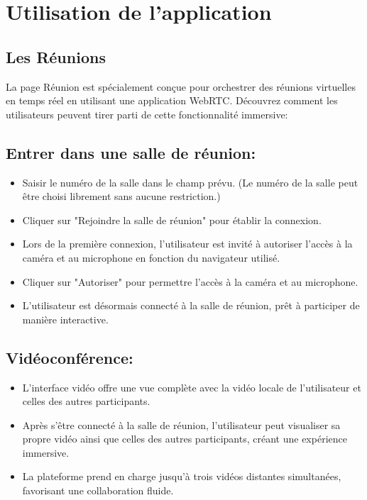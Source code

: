\documentclass[12pt, a4paper, oneside]{article}
\begin{document}
\newpage

\section{Utilisation de l'application}

\subsection{Les Réunions}

La page Réunion est spécialement conçue pour orchestrer des réunions virtuelles en temps réel en utilisant une application WebRTC. Découvrez comment les utilisateurs peuvent tirer parti de cette fonctionnalité immersive:

\subsection*{Entrer dans une salle de réunion:}
\begin{itemize}
  \item Saisir le numéro de la salle dans le champ prévu. (Le numéro de la salle peut être choisi librement sans aucune restriction.)
  \item Cliquer sur "Rejoindre la salle de réunion" pour établir la connexion.
  \item Lors de la première connexion, l'utilisateur est invité à autoriser l'accès à la caméra et au microphone en fonction du navigateur utilisé.
  \item Cliquer sur "Autoriser" pour permettre l'accès à la caméra et au microphone.
  \item L'utilisateur est désormais connecté à la salle de réunion, prêt à participer de manière interactive.
\end{itemize}

\subsection*{Vidéoconférence:}
\begin{itemize}
  \item L'interface vidéo offre une vue complète avec la vidéo locale de l'utilisateur et celles des autres participants.
  \item Après s'être connecté à la salle de réunion, l'utilisateur peut visualiser sa propre vidéo ainsi que celles des autres participants, créant une expérience immersive.
  \item La plateforme prend en charge jusqu'à trois vidéos distantes simultanées, favorisant une collaboration fluide.
\end{itemize}
\end{document}
